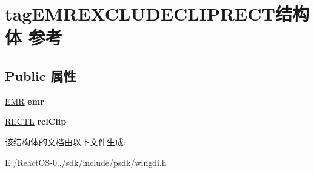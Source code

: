 \hypertarget{structtag_e_m_r_e_x_c_l_u_d_e_c_l_i_p_r_e_c_t}{}\section{tag\+E\+M\+R\+E\+X\+C\+L\+U\+D\+E\+C\+L\+I\+P\+R\+E\+C\+T结构体 参考}
\label{structtag_e_m_r_e_x_c_l_u_d_e_c_l_i_p_r_e_c_t}
\subsection*{Public 属性}
\begin{DoxyCompactItemize}
\item 
\mbox{\label{structtag_e_m_r_e_x_c_l_u_d_e_c_l_i_p_r_e_c_t_adb83742eddcf5b17dbcf8cb56ec6641f}} 
\hyperlink{structtag_e_m_r}{E\+MR} {\bfseries emr}
\item 
\mbox{\label{structtag_e_m_r_e_x_c_l_u_d_e_c_l_i_p_r_e_c_t_a89f17ed09eed43032b8c3e93c02f13c3}} 
\hyperlink{struct___r_e_c_t_l}{R\+E\+C\+TL} {\bfseries rcl\+Clip}
\end{DoxyCompactItemize}


该结构体的文档由以下文件生成\+:\begin{DoxyCompactItemize}
\item 
E\+:/\+React\+O\+S-\/0../sdk/include/psdk/wingdi.\+h\end{DoxyCompactItemize}
